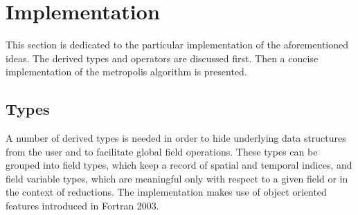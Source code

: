 \documentclass[graybox]{svmult}
\begin{document}
\section{Implementation}
This section is dedicated to the particular implementation of the aforementioned ideas. The derived types and operators are discussed first. Then a concise implementation of the metropolis algorithm is presented.

\subsection{Types}
A number of derived types is needed in order to hide underlying data structures from the user and to facilitate global field operations. These types can be grouped into field types, which keep a record of spatial and temporal indices, and field variable types, which are meaningful only with respect to a given field or in the context of reductions. The implementation makes use of object oriented features introduced in Fortran 2003.
\end{document}
